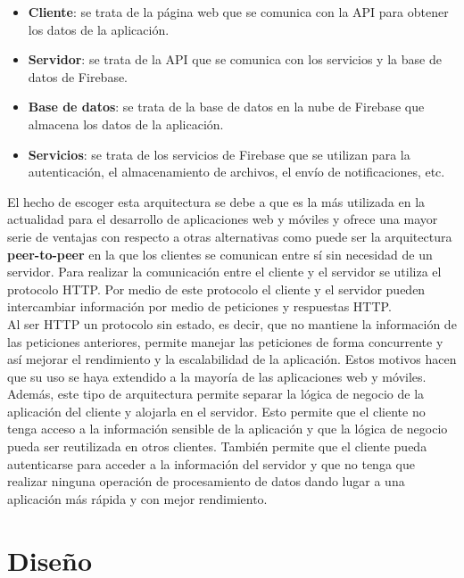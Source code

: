\newpage

\begin{itemize}
    \item \textbf{Cliente}: se trata de la página web que se comunica con la API para obtener los datos de la aplicación.
    \item \textbf{Servidor}: se trata de la API que se comunica con los servicios y la base de datos de Firebase.
    \item \textbf{Base de datos}: se trata de la base de datos en la nube de Firebase que almacena los datos de la aplicación.
    \item \textbf{Servicios}: se trata de los servicios de Firebase que se utilizan para la autenticación, el almacenamiento
    de archivos, el envío de notificaciones, etc.
\end{itemize}

El hecho de escoger esta arquitectura se debe a que es la más utilizada en la actualidad para el desarrollo de aplicaciones
web y móviles y ofrece una mayor serie de ventajas con respecto a otras alternativas como puede ser la arquitectura \textbf{peer-to-peer}
en la que los clientes se comunican entre sí sin necesidad de un servidor. Para realizar la comunicación entre el cliente
y el servidor se utiliza el protocolo HTTP. Por medio de este protocolo el cliente y el servidor pueden
intercambiar información por medio de peticiones y respuestas HTTP. \\

Al ser HTTP un protocolo sin estado, es decir, que no mantiene la información de las peticiones anteriores, permite
manejar las peticiones de forma concurrente y así mejorar el rendimiento y la escalabilidad de la aplicación. Estos
motivos hacen que su uso se haya extendido a la mayoría de las aplicaciones web y móviles. \\

Además, este tipo de arquitectura permite separar la lógica de negocio de la aplicación del cliente y alojarla en el
servidor. Esto permite que el cliente no tenga acceso a la información sensible de la aplicación y que la lógica de
negocio pueda ser reutilizada en otros clientes. También permite que el cliente pueda autenticarse para acceder a la
información del servidor y que no tenga que realizar ninguna operación de procesamiento de datos dando lugar a una
aplicación más rápida y con mejor rendimiento.

\newpage

\section{Diseño}\label{sec:diseno}

